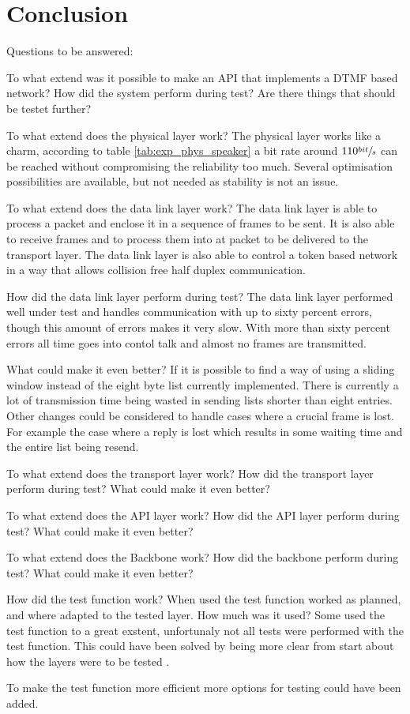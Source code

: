 \chapter{Conclusion}\label{chap:conclusion}
Questions to be answered:

To what extend was it possible to make an API that implements a DTMF based
network?
How did the system perform during test? 
Are there things that should be testet further?

To what extend does the physical layer work? 
The physical layer works like a charm, according to table \ref{tab:exp_phys_speaker} a bit rate around $110\sfrac{bit}{s}$ can be reached without compromising the reliability too much. Several optimisation possibilities are available, but not needed as stability is not an issue.

  To what extend does the data link layer work? 
The data link layer is able to process a packet and enclose it in a sequence of
frames to be sent. It is also able to receive frames and to process them into at
packet to be delivered to the transport layer. The data link layer is also able
to control a token based network in a way that allows collision free half duplex
communication. 

  How did the data link layer perform during test? The data link
layer performed well under test and handles communication with up to sixty
percent errors, though this amount of errors makes it very slow. With more than
sixty percent errors all time goes into contol talk and almost no frames are
transmitted.

  What could make it even better?
If it is possible to find a way of using a sliding window instead of the eight
byte list currently implemented. There is currently a lot of transmission time
being wasted in sending lists shorter than eight entries. Other changes could be
considered to handle cases where a crucial frame is lost. For example the case
where a reply is lost which results in some waiting time and the entire list
being resend.

To what extend does the transport layer work? 
How did the transport layer perform during test?
What could make it even better?

To what extend does the API layer work? 
How did the API layer perform during test?
What could make it even better?

To what extend does the Backbone work? 
How did the backbone perform during test?
What could make it even better?


How did the test function work?
When used the test function worked as planned, and where adapted to the tested layer. 
How much was it used?
Some used the test function to a great exstent, unfortunaly not all tests were performed with the test function. This could have been solved by being more clear from start about how the layers were to be tested . 

To make the test function more efficient more options for testing could have been added.
